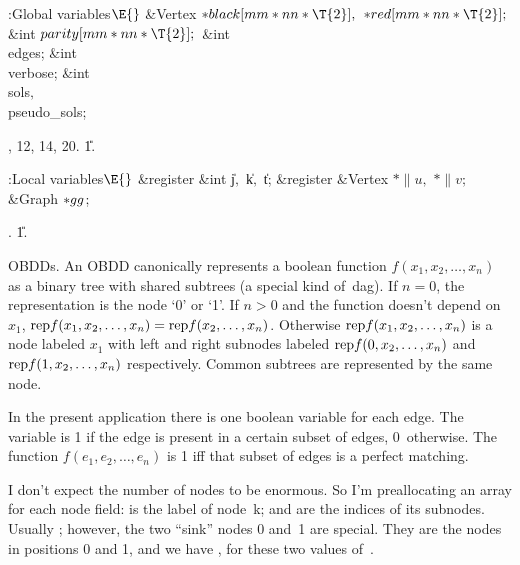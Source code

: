 \B{}:Global variables\X${}\E{}$\6
\&{Vertex} ${}{*}\\{black}[\\{mm}*\\{nn}*\T{2}],{}$ ${}{*}\\{red}[\\{mm}*%
\\{nn}*\T{2}];{}$\6
\&{int} ${}\\{parity}[\\{mm}*\\{nn}*\T{2}];{}$\6
\&{int} \\{edges};\6
\&{int} \\{verbose};\6
\&{int} \\{sols}${},{}$ \\{pseudo\_sols};\par
{}, 12, 14, 20.
\U1.\fi

\B{}:Local variables\X${}\E{}$\6
\&{register} \&{int} \|j${},{}$ \|k${},{}$ \|t;\6
\&{register} \&{Vertex} ${}{*}\|u,{}$ ${}{*}\|v;{}$\6
\&{Graph} ${}{*}\\{gg}{}$;\par
{}.
\U1.\fi

OBDDs. An OBDD canonically represents a boolean function
$f(x_1,x_2,\ldots,x_n)$ as a binary tree with shared subtrees (a special kind
of~dag). If $n=0$, the representation is the node `0' or `1'. If $n>0$ and the
function doesn't depend on $x_1$,
\def\rep{\hbox{rep}}%
$\rep f(x_1,x_2,\ldots,x_n)=\rep f(x_2,\ldots,x_n)$. Otherwise
$\rep f(x_1,x_2,\ldots,x_n)$ is a node labeled $x_1$ with left and right
subnodes labeled $\rep f(0,x_2,\ldots,x_n)$ and $\rep f(1,x_2,\ldots,x_n)$
respectively. Common subtrees are represented by the same node.

In the present application there is one boolean variable for each edge.
The variable is 1 if the edge is present in a certain subset of edges,
0~otherwise. The function $f(e_1,e_2,\ldots,e_n)$ is 1 iff that subset
of edges is a perfect matching.

I don't expect the number of nodes to be enormous. So I'm preallocating an
array for each node field:  is the label of node~k;  and
 are the indices of its subnodes. Usually ;
however, the two ``sink'' nodes 0 and~1 are special. They are the nodes in
positions 0 and 1, and we have ,  for
these two values of~.

